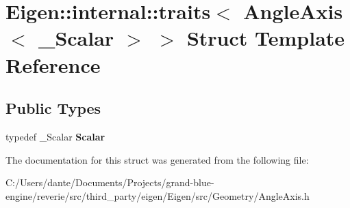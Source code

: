 \hypertarget{struct_eigen_1_1internal_1_1traits_3_01_angle_axis_3_01___scalar_01_4_01_4}{}\section{Eigen\+::internal\+::traits$<$ Angle\+Axis$<$ \+\_\+\+Scalar $>$ $>$ Struct Template Reference}
\label{struct_eigen_1_1internal_1_1traits_3_01_angle_axis_3_01___scalar_01_4_01_4}
\subsection*{Public Types}
\begin{DoxyCompactItemize}
\item 
\mbox{\label{struct_eigen_1_1internal_1_1traits_3_01_angle_axis_3_01___scalar_01_4_01_4_a48938b3bc839f2596f7347d84822ee33}} 
typedef \+\_\+\+Scalar {\bfseries Scalar}
\end{DoxyCompactItemize}


The documentation for this struct was generated from the following file\+:\begin{DoxyCompactItemize}
\item 
C\+:/\+Users/dante/\+Documents/\+Projects/grand-\/blue-\/engine/reverie/src/third\+\_\+party/eigen/\+Eigen/src/\+Geometry/Angle\+Axis.\+h\end{DoxyCompactItemize}
